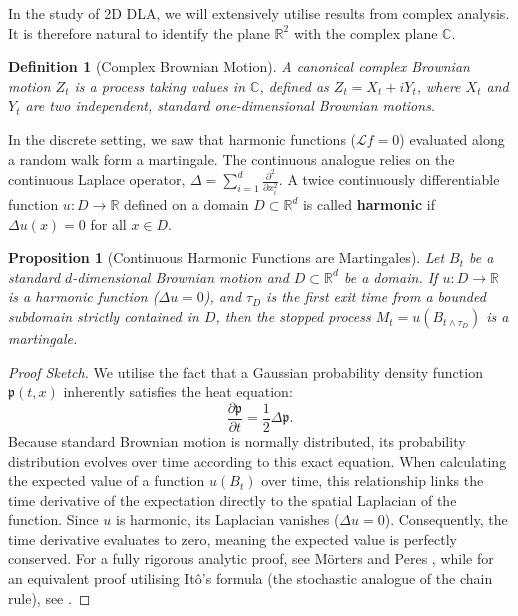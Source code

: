 \documentclass[12pt, a4paper, oneside]{report}
\newtheorem{definition}[theorem]{Definition}
\newtheorem{proposition}[theorem]{Proposition}
\theoremstyle{remark}
\begin{document}
In the study of 2D DLA, we will extensively utilise results from complex analysis. It is therefore natural to identify the plane $\mathbb{R}^2$ with the complex plane $\mathbb{C}$.

\begin{definition}[Complex Brownian Motion]
A canonical complex Brownian motion $Z_t$ is a process taking values in $\mathbb{C}$, defined as $Z_t = X_t + iY_t$, where $X_t$ and $Y_t$ are two independent, standard one-dimensional Brownian motions.
\end{definition}

In the discrete setting, we saw that harmonic functions ($\mathcal{L}f = 0$) evaluated along a random walk form a martingale. The continuous analogue relies on the continuous Laplace operator, $\Delta = \sum_{i=1}^d \frac{\partial^2}{\partial x_i^2}$. A twice continuously differentiable function $u: D \to \mathbb{R}$ defined on a domain $D \subset \mathbb{R}^d$ is called \textbf{harmonic} if $\Delta u(x) = 0$ for all $x \in D$.

\begin{proposition}[Continuous Harmonic Functions are Martingales]
\label{prop:continuous_martingale}
Let $B_t$ be a standard $d$-dimensional Brownian motion and $D \subset \mathbb{R}^d$ be a domain. If $u: D \to \mathbb{R}$ is a harmonic function ($\Delta u = 0$), and $\tau_D$ is the first exit time from a bounded subdomain strictly contained in $D$, then the stopped process $M_t = u(B_{t \wedge \tau_D})$ is a martingale.
\end{proposition}

\begin{proof}[Proof Sketch]
We utilise the fact that a Gaussian probability density function $\mathfrak{p}(t, x)$ inherently satisfies the heat equation:
\begin{equation*}
    \frac{\partial \mathfrak{p}}{\partial t} = \frac{1}{2}\Delta \mathfrak{p}.
\end{equation*}
Because standard Brownian motion is normally distributed, its probability distribution evolves over time according to this exact equation. When calculating the expected value of a function $u(B_t)$ over time, this relationship links the time derivative of the expectation directly to the spatial Laplacian of the function. Since $u$ is harmonic, its Laplacian vanishes ($\Delta u = 0$). Consequently, the time derivative evaluates to zero, meaning the expected value is perfectly conserved.
For a fully rigorous analytic proof, see M{\"o}rters and Peres \cite[Theorem 2.51 and Corollary 2.53]{Morters2010}, while for an equivalent proof utilising Itô's formula (the stochastic analogue of the chain rule), see \cite[Theorem 7.18]{Morters2010}.
\end{proof}
\end{document}
